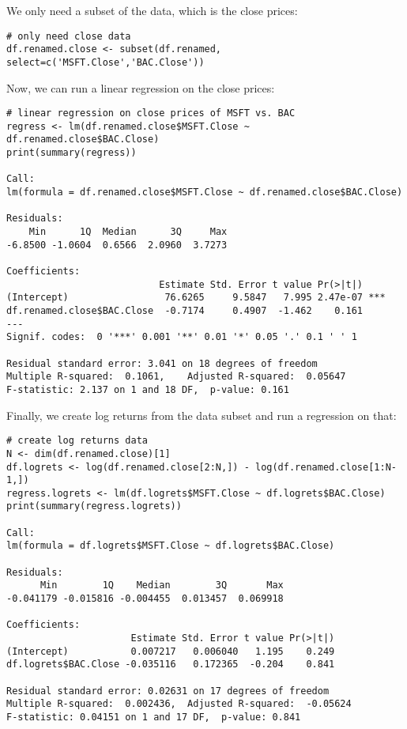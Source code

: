 \documentclass[paper=a4, fontsize=11pt]{scrartcl} %
\numberwithin{equation}{section} %
\numberwithin{figure}{section} %
\numberwithin{table}{section} %
\begin{document}
We only need a subset of the data, which is the close prices:

\begin{verbatim}
# only need close data
df.renamed.close <- subset(df.renamed, select=c('MSFT.Close','BAC.Close'))
\end{verbatim}

Now, we can run a linear regression on the close prices:

\begin{verbatim}
# linear regression on close prices of MSFT vs. BAC
regress <- lm(df.renamed.close$MSFT.Close ~ df.renamed.close$BAC.Close)
print(summary(regress))

Call:
lm(formula = df.renamed.close$MSFT.Close ~ df.renamed.close$BAC.Close)

Residuals:
    Min      1Q  Median      3Q     Max 
-6.8500 -1.0604  0.6566  2.0960  3.7273 

Coefficients:
                           Estimate Std. Error t value Pr(>|t|)    
(Intercept)                 76.6265     9.5847   7.995 2.47e-07 ***
df.renamed.close$BAC.Close  -0.7174     0.4907  -1.462    0.161    
---
Signif. codes:  0 '***' 0.001 '**' 0.01 '*' 0.05 '.' 0.1 ' ' 1

Residual standard error: 3.041 on 18 degrees of freedom
Multiple R-squared:  0.1061,	Adjusted R-squared:  0.05647 
F-statistic: 2.137 on 1 and 18 DF,  p-value: 0.161
\end{verbatim}

Finally, we create log returns from the data subset and run a regression on that:

\begin{verbatim}
# create log returns data
N <- dim(df.renamed.close)[1]
df.logrets <- log(df.renamed.close[2:N,]) - log(df.renamed.close[1:N-1,])
regress.logrets <- lm(df.logrets$MSFT.Close ~ df.logrets$BAC.Close)
print(summary(regress.logrets))

Call:
lm(formula = df.logrets$MSFT.Close ~ df.logrets$BAC.Close)

Residuals:
      Min        1Q    Median        3Q       Max 
-0.041179 -0.015816 -0.004455  0.013457  0.069918 

Coefficients:
                      Estimate Std. Error t value Pr(>|t|)
(Intercept)           0.007217   0.006040   1.195    0.249
df.logrets$BAC.Close -0.035116   0.172365  -0.204    0.841

Residual standard error: 0.02631 on 17 degrees of freedom
Multiple R-squared:  0.002436,	Adjusted R-squared:  -0.05624 
F-statistic: 0.04151 on 1 and 17 DF,  p-value: 0.841
\end{verbatim}


\end{document}
